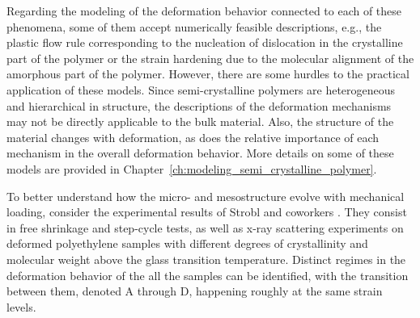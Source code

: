 Regarding the modeling of the deformation behavior connected to each of these phenomena, some of them accept numerically feasible descriptions, e.g., the plastic flow rule corresponding to the nucleation of dislocation in the crystalline part of the polymer or the strain hardening due to the molecular alignment of the amorphous part of the polymer.
However, there are some hurdles to the practical application of these models.
Since semi-crystalline polymers are heterogeneous and hierarchical in structure, the descriptions of the deformation mechanisms may not be directly applicable to the bulk material.
Also, the structure of the material changes with deformation, as does the relative importance of each mechanism in the overall deformation behavior.
More details on some of these models are provided in Chapter~\ref{ch:modeling_semi_crystalline_polymer}.

To better understand how the micro- and mesostructure evolve with mechanical loading, consider the experimental results of Strobl and coworkers \citep{hissNetworkStretchingSlip1999, hobeikaTemperatureStrainRate2000, hongModelTreatingTensile2004, hongModelTreatmentTensile2004, naViscousForceDominatedTensileDeformation2006}.
They consist in free shrinkage and step-cycle tests, as well as x-ray scattering experiments on deformed polyethylene samples with different degrees of crystallinity and molecular weight above the glass transition temperature.
Distinct regimes in the deformation behavior of the all the samples can be identified, with the transition between them, denoted A through D, happening roughly at the same strain levels.

